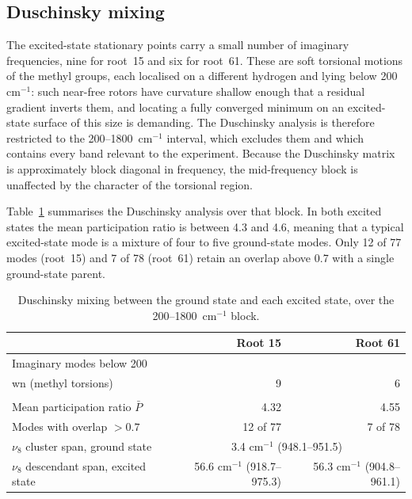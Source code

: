 \documentclass[11pt,a4paper]{article}
\newcommand{\wn}{\ensuremath{\mathrm{cm^{-1}}}}
\begin{document}
\subsection{Duschinsky mixing}

The excited-state stationary points carry a small number of imaginary
frequencies, nine for root~15 and six for root~61. These are soft torsional
motions of the methyl groups, each localised on a different hydrogen and lying
below 200~\wn{}: such near-free rotors have curvature shallow enough that a
residual gradient inverts them, and locating a fully converged minimum on an
excited-state surface of this size is demanding. The Duschinsky analysis is
therefore restricted to the 200--1800~\wn{} interval, which excludes them and
which contains every band relevant to the experiment. Because the Duschinsky
matrix is approximately block diagonal in frequency, the mid-frequency block
is unaffected by the character of the torsional region.

Table~\ref{tab:dusch} summarises the Duschinsky analysis over that block. In
both excited states the mean participation ratio is between 4.3 and 4.6,
meaning that a typical excited-state mode is a mixture of four to five
ground-state modes. Only 12 of 77 modes (root~15) and 7 of 78 (root~61) retain
an overlap above 0.7 with a single ground-state parent.

\begin{table}[htbp]
\centering
\caption{Duschinsky mixing between the ground state and each excited state,
over the 200--1800~\wn{} block.}
\label{tab:dusch}
\begin{tabular}{l r r}
\toprule
& Root 15 & Root 61 \\
\midrule
Imaginary modes below 200~\\wn{} (methyl torsions) & 9 & 6 \\\\
Mean participation ratio $\bar{P}$        & 4.32 & 4.55 \\
Modes with overlap $> 0.7$                & 12 of 77 & 7 of 78 \\
$\nu_8$ cluster span, ground state        & \multicolumn{2}{c}{3.4 \wn{} (948.1--951.5)} \\
$\nu_8$ descendant span, excited state    & 56.6 \wn{} (918.7--975.3) & 56.3 \wn{} (904.8--961.1) \\
\bottomrule
\end{tabular}
\end{table}
\end{document}
